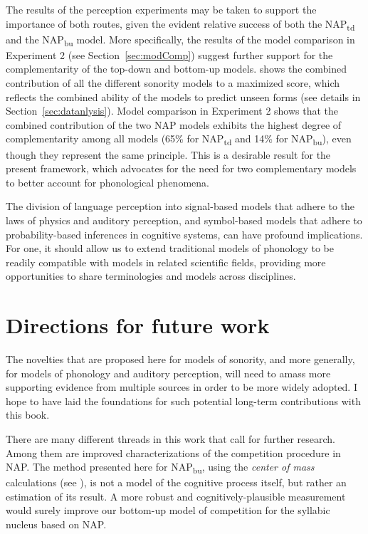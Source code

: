 The results of the perception experiments may be taken to support the importance of both routes, given the evident relative success of both the NAP\textsubscript{td} and the NAP\textsubscript{bu} model. More specifically, the results of the model comparison in Experiment 2 (see Section~\ref{sec:modComp}) suggest further support for the complementarity of the top-down and bottom-up models.
 shows the combined contribution of all the different sonority models to a maximized score, which reflects the combined ability of the models to predict unseen forms (see details in Section~\ref{sec:datanlysis}).
Model comparison in Experiment 2 shows that the combined contribution of the two NAP models exhibits the highest degree of complementarity among all models (65\% for NAP\textsubscript{td} and 14\% for NAP\textsubscript{bu}), even though they represent the same principle.
This is a desirable result for the present framework, which advocates for the need for two complementary models to better account for phonological phenomena.

The division of language perception into signal-based models that adhere to the laws of physics and auditory perception, and symbol-based models that adhere to probability-based inferences in cognitive systems, can have profound implications.
For one, it should allow us to extend traditional models of phonology to be readily compatible with models in related scientific fields, providing more opportunities to share terminologies and models across disciplines.

\section{Directions for future work}\label{sec:directions}

The novelties that are proposed here for models of sonority, and more generally, for models of phonology and auditory perception, will need to amass more supporting evidence from multiple sources in order to be more widely adopted.
I hope to have laid the foundations for such potential long-term contributions with this book.

There are many different threads 
in this work that call for further research.
Among them are improved characterizations of the competition procedure in NAP. The method presented here for NAP\textsubscript{bu}, using the \emph{center of mass} calculations (see ), is not a model of the cognitive process itself, but rather an estimation of its result. A more robust and cognitively-plausible measurement would surely improve our bottom-up model of competition for the syllabic nucleus based on NAP.

